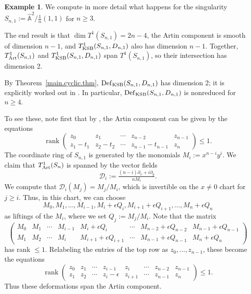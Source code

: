 \documentclass{amsart}
\theoremstyle{definition}
\newtheorem{exmp}[thm]{Example}
\theoremstyle{remark}
\renewcommand{\a}[0]{\hat{\mathbb A}}
\newcommand{\rank}[0]{\operatorname{rank}}
\newcommand{\dx}[0]{\partial_x}
\newcommand{\dy}[0]{\partial_y}
\newcommand{\defsp}[0]{\operatorname{Def}}
\begin{document}
\begin{exmp} We compute in more detail what happens for the singularity
  $S_{n,1}:=\a^2/\frac1{n}(1,1)$ for $n\geq 3$.

  The end result is that $\dim T^1(S_{n,1})=2n-4$, the Artin component is smooth
  of dimension $n-1$, and $T^1_{\rm KSB}(S_{n,1}, D_{n,1})$  also
has dimension $n-1$. Together, $T^1_{\rm Art}(S_{n,1})$ and $T^1_{\rm KSB}(S_{n,1}, D_{n,1})$
span $T^1(S_{n,1})$, so their intersection has dimension 2.

By Theorem~\ref{main.cyclic.thm}, $\defsp_{\rm KSB}(S_{n,1}, D_{n,1})$ has dimension 2; it is explicitly worked out  in   \cite[2.32]{k-modbook}.
In particular, $\defsp_{\rm KSB}(S_{n,1}, D_{n,1})$ is nonreduced for $n\geq 4$.

To see these, note first  that by
\cite{pinkham}, the Artin component can be given by the  equations 
$$
\rank
\left(
\begin{array}{ccccc}
  z_0 & z_1 & \cdots &  z_{n-2} & z_{n-1}\\ 
 z_1-t_1 & z_2-t_2 & \cdots &  z_{n-1}-t_{n-1} & z_{n}
\end{array}
\right) \leq 1.
$$
The coordinate ring of $S_{n,1}$ is generated by the monomials
$M_i:=x^{n-i}y^i$. We claim that $T^1_{\rm Art}(S_n)$ is spanned
 by the vector fields
$$
{\mathcal D}_i:=\tfrac{(n-i)\dx+i\dy}{nM_i}.
$$
We compute that 
${\mathcal D}_i(M_j)=M_j/M_i$,
which is invertible on the $x\neq 0$ chart for $j\geq i$. Thus, in this chart, we can choose 
$$
M_0, M_1, \dots, M_{i-1}, M_i+\epsilon Q_i,
M_{i+1}+\epsilon Q_{i+1},\dots,
M_n+\epsilon Q_n
$$
as liftings of the $M_i$, where we set  $Q_j:={M_j}/{M_i}$.
Note that  the matrix
$$
\left(
\begin{array}{ccccccccc}
  M_0 & M_1 & \cdots & M_{i-1} & M_i+\epsilon Q_i & \cdots & M_{n-2}+\epsilon Q_{n-2} & M_{n-1}+\epsilon Q_{n-1}\\
  M_1 & M_2 & \cdots & M_i & M_{i+1}+\epsilon Q_{i+1}&\cdots &  M_{n-1}+\epsilon Q_{n-1} & M_n+\epsilon Q_n
\end{array}
\right)
$$
has rank $\leq 1$. Relabeling the entries of the top row as
$z_0,\dots, z_{n-1}$, these become  the equations
$$
\rank
\left(
\begin{array}{ccccccccc}
  z_0 & z_1 & \cdots & z_{i-1} & z_i & \cdots &  z_{n-2} & z_{n-1}\\ 
 z_1 & z_2 & \cdots & z_{i}-\epsilon & z_{i+1} & \cdots &  z_{n-1} & z_{n}
\end{array}
\right) \leq 1.
$$
Thus these deformations span the Artin component.
\end{exmp}
\end{document}
